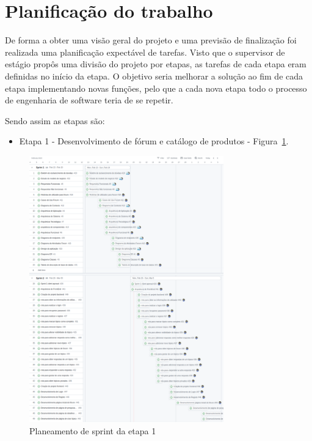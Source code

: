 \newpage

\section{Planificação do trabalho}

De forma a obter uma visão geral do projeto e uma previsão de finalização foi realizada uma planificação 
expectável de tarefas. Visto que o supervisor de estágio propôs uma divisão do projeto por etapas, as 
tarefas de cada etapa eram definidas no início da etapa. O objetivo seria melhorar a solução ao fim de 
cada etapa implementando novas funções, pelo que a cada nova etapa todo o processo de engenharia de 
software teria de se repetir.

Sendo assim as etapas são:
\begin{itemize}
    \item Etapa 1 - Desenvolvimento de fórum e catálogo de produtos - Figura~\ref{fig:1}.
    
\end{itemize}

\begin{figure}[htb]
    \centering
    
    \includegraphics[width=0.75\textwidth]{images/etapa1_sprint_planning.png}
    \caption{Planeamento de sprint da etapa 1}
    \label{fig:1}
\end{figure}



